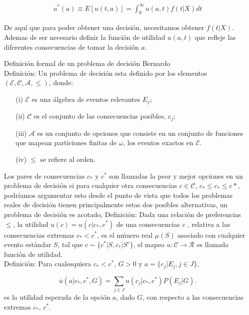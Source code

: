 \documentclass[letterpaper, titlepage,openright, twoside,11pt]{book}
\begin{document}
\begin{eqnarray*}
u^{*}(a)\equiv E[u(t,a)]=\int_{0}^{\infty} u(a,t)f(t|X) dt
\end{eqnarray*}


De aqu\'i que para poder obtener una decisi\'on, necesitamos obtener $f(t|X)$. Ademas de ser necesario definir la funci\'on de utilidad $u(a,t)$ que refleje las diferentes consecuencias de tomar la decisi\'on $a$.

Definici\'on formal de un problema de decisi\'on Bernardo\\[0.2cm]

Definici\'on: Un problema de decisi\'on esta definido por los elementos $(\mathcal{E}, \mathcal{C}, \mathcal{A},\leq)$, donde:

\begin{itemize}
\item[(i)]  $\mathcal{E}$ es una \'algebra de eventos relevantes $E_{j}$;
\item[(ii)] $\mathcal{C}$ es el conjunto de las consecuencias posibles, $c_j$;
\item[(iii)] $\mathcal{A}$ es un conjunto de opciones que consiste en un conjunto de funciones que mapean particiones finitas de $\omega$, los eventos exactos en $\mathcal{E}$.
\item[(iv)] $\leq$ se refiere al orden.
\end{itemize}


Los pares de consecuencias $c_{*}$ y $c^{*}$ son llamadas la peor y mejor opciones en un problema de decisi\'on si para cualquier otra consecuencias $c\in \mathcal{C}$, $c_{*}\leq c_{*}\leq c{*}$, podr\'iamos argumentar esto desde el punto de vista que todos los problemas reales de decisi\'on tienen principalmente estas dos posibles alternativas, un problema de decisi\'on es acotado,
Definici\'on: Dada una relaci\'on de preferencias $\leq$, la utilidad $u(c)=u(c|c_{*},c^{*})$ de una consecuencias $c$
, relativa a las consecuencias extremas $c_{*}<c^{*}$, es el n\'muero real $\mu(S)$ asociado con cualquier evento est\'andar $S$, tal que $c\sim\{c^{*}|S,c_{*}|S^{c}\}$, el mapeo $u:\mathcal{C}\rightarrow \mathcal{R}$ es llamada funci\'on de utilidad.\\[0.2cm]

Definici\'on: Para cualesquiera $c_{*}<c^{*}$, $G>0$ y $a=\{c_j| E_j, j \in J\},$

$$\overline{u}(a|c_{*}, c^{*},G)=\sum_{j\in J} u (c_j| c_{*}, c^{*})P(E_j|G).$$
es la utilidad esperada de la opci\'on $a$, dado $G$, con respecto a las consecuencias extremas  $c_{*}$, $c^{*}$.
\end{document}
